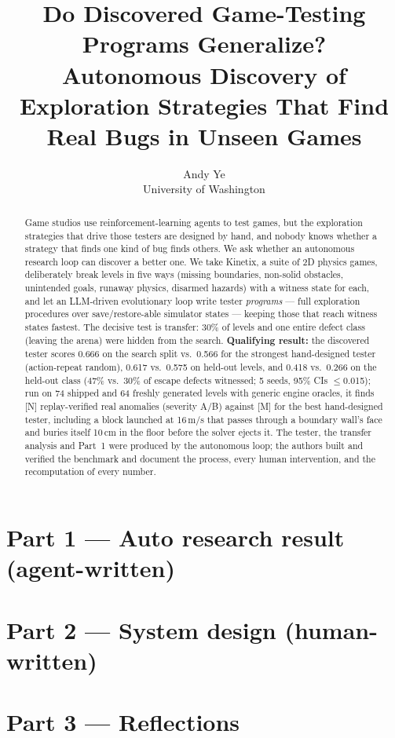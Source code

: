 \documentclass[10pt]{article}
\title{Do Discovered Game-Testing Programs Generalize?\\Autonomous Discovery of Exploration Strategies That Find Real Bugs in Unseen Games}
\author{Andy Ye \\ University of Washington}
\begin{document}
\maketitle
\begin{abstract}
Game studios use reinforcement-learning agents to test games, but the exploration strategies that drive those testers are designed by
hand, and nobody knows whether a strategy that finds one kind of bug finds others. We ask whether an autonomous research loop can
discover a better one. We take Kinetix, a suite of 2D physics games, deliberately break levels in five ways (missing boundaries,
non-solid obstacles, unintended goals, runaway physics, disarmed hazards) with a witness state for each, and let an LLM-driven
evolutionary loop write tester \emph{programs} --- full exploration procedures over save/restore-able simulator states --- keeping
those that reach witness states fastest. The decisive test is transfer: 30\% of levels and one entire defect class (leaving the arena)
were hidden from the search. \textbf{Qualifying result:} the discovered tester scores 0.666 on the search split vs.\ 0.566 for the strongest
hand-designed tester (action-repeat random), 0.617 vs.\ 0.575 on held-out levels, and 0.418 vs.\ 0.266 on the held-out class (47\% vs.\ 30\% of escape defects witnessed; 5 seeds, 95\% CIs $\le$0.015); run on
74 shipped and 64 freshly generated levels with generic engine oracles, it finds [N] replay-verified real anomalies (severity A/B)
against [M] for the best hand-designed tester, including a block launched at 16\,m/s that passes through a boundary wall's face and buries itself 10\,cm in the floor before the solver ejects it.
The tester, the transfer analysis and Part~1 were produced by the autonomous loop; the authors built and verified the benchmark and
document the process, every human intervention, and the recomputation of every number.
\end{abstract}

\section*{Part 1 --- Auto research result (agent-written)}


\section*{Part 2 --- System design (human-written)}


\section*{Part 3 --- Reflections}




\end{document}
